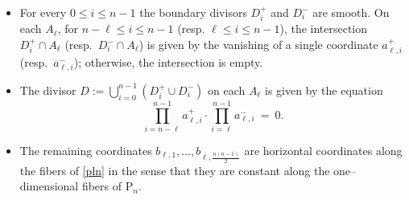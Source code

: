 \documentclass[10pt]{amsart}
\theoremstyle{definition}
\newcommand{\PL}{\mathrm{P}}
\theoremstyle{plain} %
\begin{document}
\begin{itemize}
\item[-] For every $0\le i\le n-1$ the boundary divisors $D_i^+$ and
$D_i^-$ are smooth. On each $A_\ell$, for $n-\ell\leq i\leq n-1$ (resp. $\ell\leq i\leq n-1$), the intersection
$D_i^+\cap A_\ell$ (resp.\ $D_i^-\cap A_\ell$) is given by the vanishing
of a single coordinate $a_{\ell,i}^+$ (resp.\ $a_{\ell,i}^-$); otherwise, the intersection is empty.

\item[-] The divisor
$D := \bigcup_{i=0}^{n-1}(D_i^+\cup D_i^-)$ on each $A_\ell$ is given by the equation \[\prod_{i=n-\ell}^{n-1} a_{\ell,i}^+\cdot\prod_{i=\ell}^{n-1} a_{\ell,i}^- \ =\ 0.
\] 

\item[-] The remaining coordinates $b_{\ell,1},\dots,b_{\ell,\frac{n(n-1)}{2}}$ are
horizontal coordinates along the fibers of \eqref{pln}
in the sense that they are constant %
along the one–dimensional fibers of
$\PL_n$.
\end{itemize}
\end{document}

